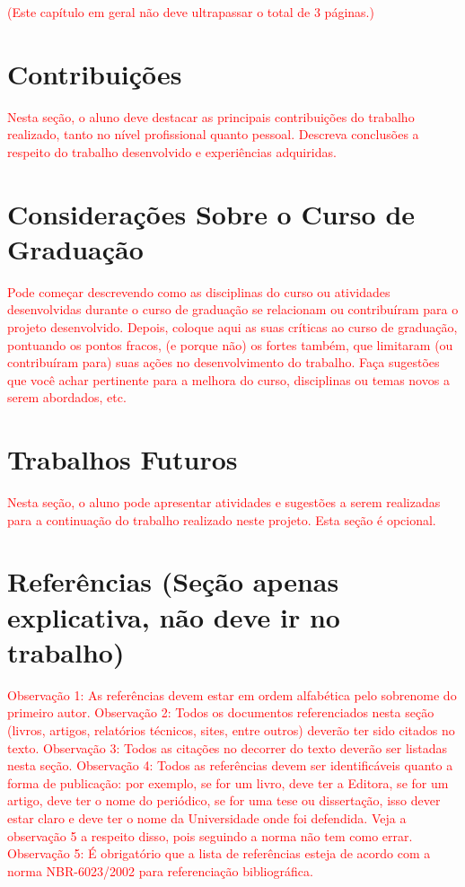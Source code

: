 \textcolor{red}{(Este capítulo em geral não deve ultrapassar o total de 3 páginas.)}

\section{Contribuições}

\textcolor{red}{Nesta seção, o aluno deve destacar as principais contribuições do trabalho realizado, tanto no nível profissional quanto pessoal. Descreva conclusões a respeito do trabalho desenvolvido e experiências adquiridas.}

\section{Considerações Sobre o Curso de Graduação}

\textcolor{red}{Pode começar descrevendo como as disciplinas do curso ou atividades desenvolvidas durante o curso de graduação se relacionam ou contribuíram para o projeto desenvolvido. 
 Depois, coloque aqui as suas críticas ao curso de graduação, pontuando os pontos fracos, (e porque não) os fortes também, que limitaram (ou contribuíram para) suas ações no desenvolvimento do trabalho. Faça sugestões que você achar pertinente para a melhora do curso, disciplinas ou temas novos a serem abordados, etc.  }

\section{Trabalhos Futuros}

\textcolor{red}{Nesta seção, o aluno pode apresentar atividades e sugestões a serem realizadas para a continuação do trabalho realizado neste projeto. Esta seção é opcional.}

\section{Referências (Seção apenas explicativa, não deve ir no trabalho)}

\textcolor{red}{Observação 1: As referências devem estar em ordem alfabética pelo sobrenome do primeiro autor. Observação 2: Todos os documentos referenciados nesta seção (livros, artigos, relatórios técnicos, sites, entre outros) deverão ter sido citados no texto. Observação 3: Todos as citações no decorrer do texto deverão ser listadas nesta seção. Observação 4: Todos as referências devem ser identificáveis quanto a forma de publicação: por exemplo, se for um livro, deve ter a Editora, se for um artigo, deve ter o nome do periódico, se for uma tese ou dissertação, isso dever estar claro e deve ter o nome da Universidade onde foi defendida. Veja a observação 5 a respeito disso, pois seguindo a norma não tem como errar. Observação 5: É obrigatório que a lista de referências esteja de acordo com a norma NBR-6023/2002 para referenciação bibliográfica.}